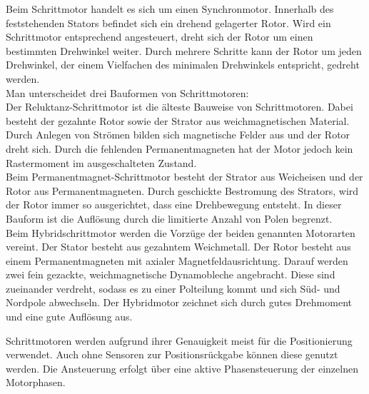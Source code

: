 Beim Schrittmotor handelt es sich um einen Synchronmotor. Innerhalb des feststehenden Stators befindet sich ein drehend gelagerter Rotor. Wird ein Schrittmotor entsprechend angesteuert, dreht sich der Rotor um einen bestimmten Drehwinkel weiter. Durch mehrere Schritte kann der Rotor um jeden Drehwinkel, der einem Vielfachen des minimalen Drehwinkels entspricht, gedreht werden.\cite{Schrittmotor} \\
Man unterscheidet drei Bauformen von Schrittmotoren: \\
Der Reluktanz-Schrittmotor ist die älteste Bauweise von Schrittmotoren. Dabei besteht der gezahnte Rotor sowie der Strator aus weichmagnetischen Material. Durch Anlegen von Strömen bilden sich magnetische Felder aus und der Rotor dreht sich. Durch die fehlenden Permanentmagneten hat der Motor jedoch kein Rastermoment im ausgeschalteten Zustand.\\
Beim Permanentmagnet-Schrittmotor besteht der Strator aus Weicheisen und der Rotor aus Permanentmagneten. Durch geschickte Bestromung des Strators, wird der Rotor immer so ausgerichtet, dass eine Drehbewegung entsteht. In dieser Bauform ist die Auflösung durch die limitierte Anzahl von Polen begrenzt.\cite{Schrittmotor_Bauformen}\\
Beim Hybridschrittmotor werden die Vorzüge der beiden genannten Motorarten vereint. Der Stator besteht aus gezahntem Weichmetall. Der Rotor besteht aus einem Permanentmagneten mit axialer Magnetfeldausrichtung. Darauf werden zwei fein gezackte, weichmagnetische Dynamobleche angebracht. Diese sind zueinander verdreht, sodass es zu einer Polteilung kommt und sich Süd- und Nordpole abwechseln. Der Hybridmotor zeichnet sich durch gutes Drehmoment und eine gute Auflösung aus.\cite{Schrittmotor_Bauformen}

Schrittmotoren werden aufgrund ihrer Genauigkeit meist für die Positionierung verwendet. Auch ohne Sensoren zur Positionsrückgabe können diese genutzt werden. Die Ansteuerung erfolgt über eine aktive Phasensteuerung der einzelnen Motorphasen. 